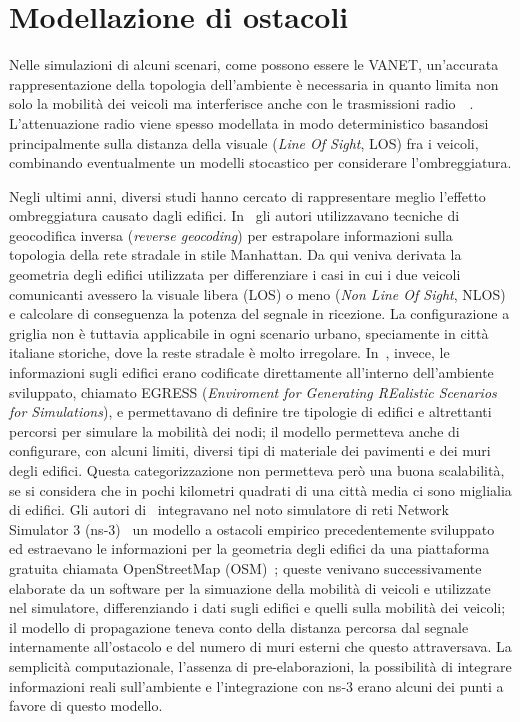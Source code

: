 \section{Modellazione di ostacoli}\label{sec:modellazione-ostacoli}
Nelle simulazioni di alcuni scenari, come possono essere le VANET, un'accurata rappresentazione della topologia dell'ambiente è necessaria
in quanto limita non solo la mobilità dei veicoli ma interferisce anche con le trasmissioni radio~\cite{7543980}~\cite{amjad2015impact}.
L'attenuazione radio viene spesso modellata in modo deterministico basandosi principalmente sulla distanza della visuale (\textit{Line Of Sight}, LOS)
fra i veicoli, combinando eventualmente un modelli stocastico per considerare l'ombreggiatura.

Negli ultimi anni, diversi studi hanno cercato di rappresentare meglio l'effetto ombreggiatura causato dagli edifici.
In~\cite{Giordano:2010:CST:1860058.1860065} gli autori utilizzavano tecniche di geocodifica inversa (\textit{reverse geocoding}) per estrapolare
informazioni sulla topologia della rete stradale in stile Manhattan. Da qui veniva derivata la geometria degli edifici utilizzata
per differenziare i casi in cui i due veicoli comunicanti avessero la visuale libera (LOS) o meno (\textit{Non Line Of Sight}, NLOS)
e calcolare di conseguenza la potenza del segnale in ricezione.
La configurazione a griglia non è tuttavia applicabile in ogni scenario urbano, speciamente in città italiane storiche,
dove la reste stradale è molto irregolare.
In~\cite{4020783}, invece, le informazioni sugli edifici erano codificate direttamente all'interno dell'ambiente sviluppato, chiamato
EGRESS (\textit{Enviroment for Generating REalistic Scenarios for Simulations}), e permettavano di definire tre tipologie di edifici e altrettanti
percorsi per simulare la mobilità dei nodi; il modello permetteva anche di configurare, con alcuni limiti, diversi tipi di materiale dei pavimenti e dei muri degli edifici.
Questa categorizzazione non permetteva però una buona scalabilità, se si considera che in pochi kilometri quadrati di una città media
ci sono miglialia di edifici.
Gli autori di~\cite{Carpenter:2015:OMI:2756509.2756512} integravano nel noto simulatore di reti Network Simulator 3 (ns-3)~\cite{ns3Website}
un modello a ostacoli empirico precedentemente sviluppato~\cite{5720204} ed
estraevano le informazioni per la geometria degli edifici da una piattaforma gratuita
chiamata OpenStreetMap (OSM)~\cite{osmWebsite}; queste venivano successivamente elaborate da un software per la simuazione della mobilità di veicoli
e utilizzate nel simulatore, differenziando i dati sugli edifici e quelli sulla mobilità dei veicoli;
il modello di propagazione teneva conto della distanza percorsa dal segnale internamente all'ostacolo e del numero di muri esterni che questo attraversava.
La semplicità computazionale, l'assenza di pre-elaborazioni, la possibilità di integrare informazioni reali sull'ambiente
e l'integrazione con ns-3 erano alcuni dei punti a favore di questo modello.
%
